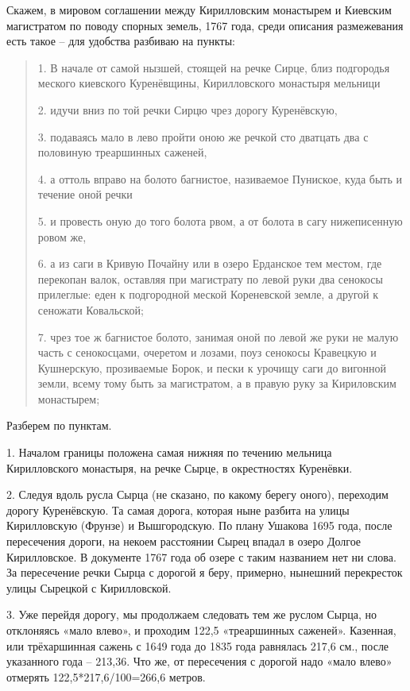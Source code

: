 Скажем, в мировом соглашении между  Кирилловским монастырем и Киевским магистратом по поводу спорных земель, 1767 года, среди описания размежевания есть такое – для удобства разбиваю на пункты:

\begin{quotation}
1. В начале от самой нызшей, стоящей на речке Сирце, близ подгородья меского киевского Куренёвщины, Кирилловского монастыря мельници 

2. идучи вниз по той речки Сирцю чрез дорогу Куренёвскую, 

3. подаваясь мало в лево пройти оною же речкой сто дватцать два с половиную треаршинных саженей, 

4. а оттоль вправо на болото багнистое, називаемое Пуниское, куда быть и течение оной речки 

5. и провесть оную до того болота рвом, а от болота в сагу нижеписенную ровом же,

6. а из саги в Кривую Почайну или в озеро Ерданское тем местом, где перекопан валок, оставляя при магистрату по левой руки два сенокосы прилеглые: еден к подгородной меской Кореневской земле, а другой к сеножати Ковальской;

7. чрез тое ж багнистое болото, занимая оной по левой же руки не малую часть с сенокосцами, очеретом и лозами, поуз сенокосы Кравецкую и Кушнерскую, прозиваемые Борок, и пески к урочищу саги до вигонной земли, всему тому быть за магистратом, а в правую руку за Кириловским монастырем; 
\end{quotation}

Разберем по пунктам.

1. Началом границы положена самая нижняя по течению мельница Кирилловского монастыря, на речке Сырце, в окрестностях Куренёвки.

2. Следуя вдоль русла Сырца (не сказано, по какому берегу оного), переходим дорогу Куренёвскую. Та самая дорога, которая ныне разбита на улицы Кирилловскую (Фрунзе) и Вышгородскую. По плану Ушакова 1695 года, после пересечения дороги, на некоем расстоянии Сырец впадал в озеро Долгое Кирилловское. В документе 1767 года об озере с таким названием нет ни слова. За пересечение речки Сырца с дорогой я беру, примерно, нынешний перекресток улицы Сырецкой с Кирилловской.

3. Уже перейдя дорогу, мы продолжаем следовать тем же руслом Сырца, но отклоняясь «мало влево», и проходим 122,5 «треаршинных саженей». Казенная, или трёхаршинная сажень с 1649 года до 1835 года равнялась 217,6 см., после указанного года – 213,36. Что же, от пересечения с дорогой надо «мало влево» отмерять 122,5*217,6/100=266,6 метров.

